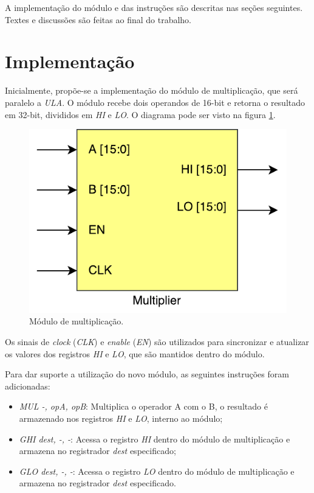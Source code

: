 \documentclass[11pt,a4paper,titlepage]{article}
\begin{document}
A implementação do módulo e das instruções são descritas nas seções seguintes. Textes e discussões são feitas ao final do trabalho.

\section{Implementação}

Inicialmente, propõe-se a implementação do módulo de multiplicação, que será paralelo a \textit{ULA}. O módulo recebe dois operandos de 16-bit e retorna o resultado em 32-bit, divididos em \textit{HI} e \textit{LO}. O diagrama pode ser visto na figura \ref{fig:mult}.

\begin{figure}[!h]
\centering
\includegraphics[scale=0.5]{images/Multiplier.pdf}
\caption{Módulo de multiplicação.}
\label{fig:mult}
\end{figure}

Os sinais de \textit{clock} (\textit{CLK}) e \textit{enable} (\textit{EN}) são utilizados para sincronizar e atualizar os valores dos registros \textit{HI} e \textit{LO}, que são mantidos dentro do módulo.

Para dar suporte a utilização do novo módulo, as seguintes instruções foram adicionadas:

\begin{itemize}
\item \textit{MUL -, opA, opB}: Multiplica o operador A com o B, o resultado é armazenado nos registros \textit{HI} e \textit{LO}, interno ao módulo;
\item \textit{GHI dest, -, -}: Acessa o registro \textit{HI} dentro do módulo de multiplicação e armazena no registrador \textit{dest} especificado;
\item \textit{GLO dest, -, -}: Acessa o registro \textit{LO} dentro do módulo de multiplicação e armazena no registrador \textit{dest} especificado.
\end{itemize}
\end{document}
